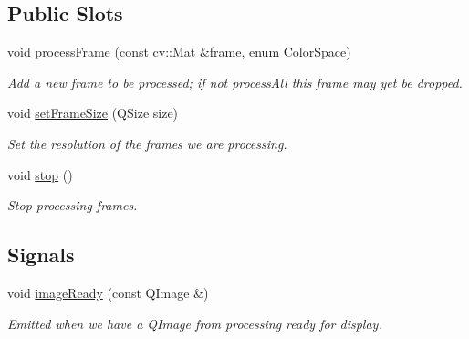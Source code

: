 \subsection*{Public Slots}
\begin{DoxyCompactItemize}
\item 
void \hyperlink{classFrameConverter_ac2c4933244f3a3e794d52263fb916e05}{process\+Frame} (const cv\+::\+Mat \&frame, enum Color\+Space)
\begin{DoxyCompactList}\small\item\em Add a new frame to be processed; if not process\+All this frame may yet be dropped. \end{DoxyCompactList}\item 
void \hyperlink{classFrameConverter_ab346b79624ba1934819ba0d0781b854b}{set\+Frame\+Size} (Q\+Size size)\hypertarget{classFrameConverter_ab346b79624ba1934819ba0d0781b854b}{}\label{classFrameConverter_ab346b79624ba1934819ba0d0781b854b}

\begin{DoxyCompactList}\small\item\em Set the resolution of the frames we are processing. \end{DoxyCompactList}\item 
void \hyperlink{classFrameConverter_aaac60c9659fba4420ebf481a12939ade}{stop} ()\hypertarget{classFrameConverter_aaac60c9659fba4420ebf481a12939ade}{}\label{classFrameConverter_aaac60c9659fba4420ebf481a12939ade}

\begin{DoxyCompactList}\small\item\em Stop processing frames. \end{DoxyCompactList}\end{DoxyCompactItemize}
\subsection*{Signals}
\begin{DoxyCompactItemize}
\item 
void \hyperlink{classFrameConverter_ac3c472e9e9cc04065283493b842b98c0}{image\+Ready} (const Q\+Image \&)\hypertarget{classFrameConverter_ac3c472e9e9cc04065283493b842b98c0}{}\label{classFrameConverter_ac3c472e9e9cc04065283493b842b98c0}

\begin{DoxyCompactList}\small\item\em Emitted when we have a Q\+Image from processing ready for display. \end{DoxyCompactList}\end{DoxyCompactItemize}
